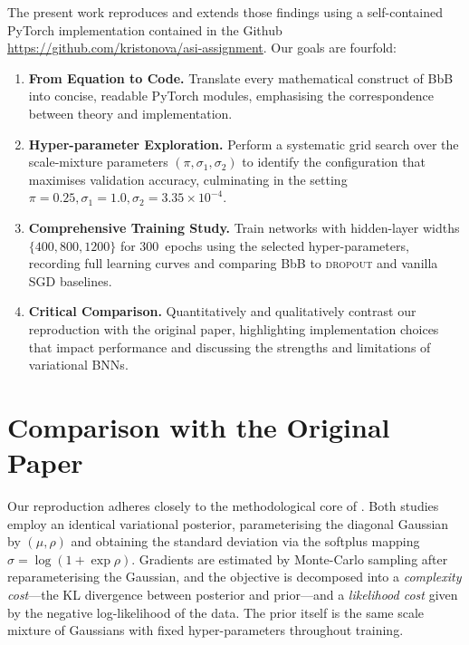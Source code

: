 \documentclass{article}
\begin{document}
The present work reproduces and extends those findings using a self-contained PyTorch implementation contained in the Github \href{https://github.com/kristonova/asi-assignment}{https://github.com/kristonova/asi-assignment}.  Our goals are fourfold:

\begin{enumerate}
 \item \textbf{From Equation to Code.}  Translate every mathematical construct of BbB into concise, readable PyTorch modules, emphasising the correspondence between theory and implementation.
 \item \textbf{Hyper-parameter Exploration.}  Perform a systematic grid search over the scale-mixture parameters $(\pi,\sigma_1,\sigma_2)$ to identify the configuration that maximises validation accuracy, culminating in the setting $\pi=0.25,\sigma_1=1.0,\sigma_2=3.35\times10^{-4}$.
 \item \textbf{Comprehensive Training Study.}  Train networks with hidden-layer widths $\{400,800,1200\}$ for 300~epochs using the selected hyper-parameters, recording full learning curves and comparing BbB to \textsc{dropout} and vanilla SGD baselines.
 \item \textbf{Critical Comparison.}  Quantitatively and qualitatively contrast our reproduction with the original paper, highlighting implementation choices that impact performance and discussing the strengths and limitations of variational BNNs.
\end{enumerate}

\section{Comparison with the Original Paper}

Our reproduction adheres closely to the methodological core of \cite{blundell2015weight}.  
Both studies employ an identical variational posterior, parameterising the diagonal Gaussian by $(\mu,\rho)$ and obtaining the standard deviation via the softplus mapping $\sigma=\log(1+\exp\rho)$.  
Gradients are estimated by Monte-Carlo sampling after reparameterising the Gaussian, and the objective is decomposed into a \emph{complexity cost}—the KL divergence between posterior and prior—and a \emph{likelihood cost} given by the negative log-likelihood of the data.  
The prior itself is the same scale mixture of Gaussians with fixed hyper-parameters throughout training.
\end{document}
